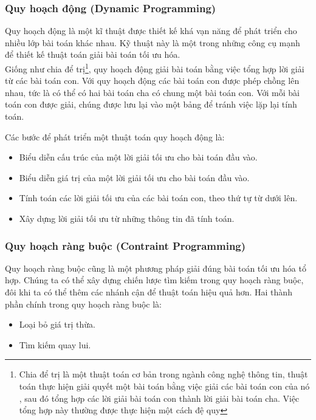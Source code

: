 \documentclass[a4paper,12pt]{report}
\begin{document}
\subsubsection{Quy hoạch động (Dynamic Programming)}
Quy hoạch động \cite{ITA} là một kĩ thuật được thiết kế khá vạn năng để phát triển cho nhiều lớp bài toán khác nhau. Kỹ thuật này là một trong những công cụ mạnh để thiết kế thuật toán giải bài toán tối ưu hóa.\\

Giống như chia để trị\footnote{Chia để trị là một thuật toán cơ bản trong ngành công nghệ thông tin, thuật toán thực hiện giải quyết một bài toán bằng việc giải các bài toán con của nó , sau đó tổng hợp các lời giải bài toán con thành lời giải bài toán cha. Việc tổng hợp này thường được thực hiện một cách đệ quy}, quy hoạch động giải bài toán bằng việc tổng hợp lời giải từ các bài toán con. Với quy hoạch động các bài toán con được phép chồng lên nhau, tức là có thể có hai bài toán cha có chung một bài toán con. Với mỗi bài toán con được giải, chúng được lưu lại vào một bảng để tránh việc lặp lại tính toán. 

 Các bước để phát triển một thuật toán quy hoạch động là:
\begin{itemize}
\item Biểu diễn cấu trúc của một lời giải  tối ưu cho bài toán đầu vào.
\item Biểu diễn giá trị của một lời giải tối ưu cho bài toán đầu vào.
\item Tính toán các lời giải tối ưu của các bài toán con, theo thứ tự từ dưới lên.
\item Xây dựng lời giải tối ưu từ những thông tin đã tính toán.
\end{itemize}
 
\subsubsection{Quy hoạch ràng buộc (Contraint Programming)}
Quy hoạch ràng buộc \cite{HCP} cũng là một phương pháp giải đúng bài toán tối ưu hóa tổ hợp. Chúng ta có thể xây dựng chiến lược tìm kiếm trong quy hoạch ràng buộc, đôi khi ta có thể thêm các nhánh cận để thuật toán hiệu quả hơn. Hai thành phần chính trong quy hoạch ràng buộc là: \begin{itemize}
\item Loại bỏ giá trị thừa.
\item Tìm kiếm quay lui.
\end{itemize}
\end{document}

